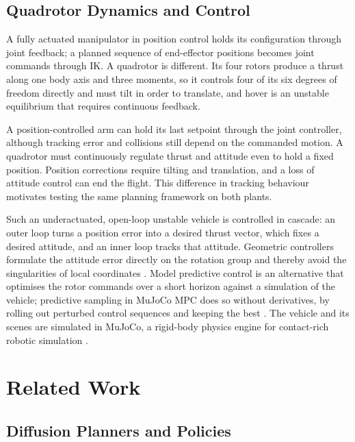 \documentclass[headsepline,footsepline,footinclude=false,oneside,fontsize=11pt,paper=a4,listof=totoc,bibliography=totoc]{scrbook}
\theoremstyle{definition}
\theoremstyle{plain}
\theoremstyle{remark}
\begin{document}
\section{Quadrotor Dynamics and Control}\label{sec:bg:quadrotor}

A fully actuated manipulator in position control holds its configuration through joint feedback; a
planned sequence of end-effector positions becomes joint commands through \ac{IK}. A quadrotor is
different. Its four rotors produce a thrust along one body axis and three moments, so it controls four
of its six degrees of freedom directly and must tilt in order to translate, and hover is an unstable
equilibrium that requires continuous feedback.

A position-controlled arm can hold its last setpoint through the joint controller, although tracking
error and collisions still depend on the commanded motion. A quadrotor must continuously regulate
thrust and attitude even to hold a fixed position. Position corrections require tilting and translation,
and a loss of attitude control can end the flight. This difference in tracking behaviour motivates
testing the same planning framework on both plants.

Such an underactuated, open-loop unstable vehicle is
controlled in cascade: an outer loop turns a position error into a desired thrust vector, which fixes a
desired attitude, and an inner loop tracks that attitude. Geometric controllers formulate the attitude
error directly on the rotation group and thereby avoid the singularities of local coordinates
\parencite{lee2010geometric}. Model predictive control is an alternative that optimises the rotor
commands over a short horizon against a simulation of the vehicle; predictive sampling in MuJoCo MPC
does so without derivatives, by rolling out perturbed control sequences and keeping the best
\parencite{howell2022predictive}. The vehicle and its scenes are simulated in MuJoCo, a rigid-body
physics engine for contact-rich robotic simulation \parencite{todorov2012mujoco}.

\chapter{Related Work}\label{ch:related}

\section{Diffusion Planners and Policies}\label{sec:rel:diffusion}
\end{document}
